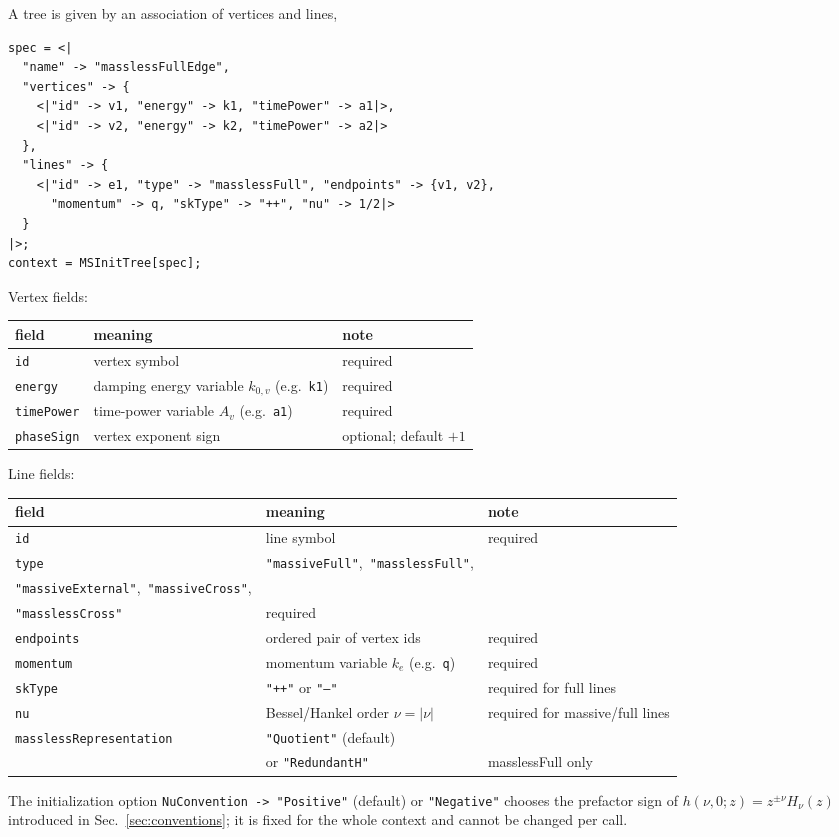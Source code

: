 \documentclass[11pt,a4paper]{article}
\begin{document}
A tree is given by an association of vertices and lines,
\begin{verbatim}
spec = <|
  "name" -> "masslessFullEdge",
  "vertices" -> {
    <|"id" -> v1, "energy" -> k1, "timePower" -> a1|>,
    <|"id" -> v2, "energy" -> k2, "timePower" -> a2|>
  },
  "lines" -> {
    <|"id" -> e1, "type" -> "masslessFull", "endpoints" -> {v1, v2},
      "momentum" -> q, "skType" -> "++", "nu" -> 1/2|>
  }
|>;
context = MSInitTree[spec];
\end{verbatim}
Vertex fields:
\begin{center}
\begin{tabular}{@{}lp{5.5cm}p{3.8cm}@{}}
\toprule
field & meaning & note\\
\midrule
\texttt{id} & vertex symbol & required\\
\texttt{energy} & damping energy variable $k_{0,v}$ (e.g.\ \texttt{k1}) & required\\
\texttt{timePower} & time-power variable $A_v$ (e.g.\ \texttt{a1}) & required\\
\texttt{phaseSign} & vertex exponent sign & optional; default $+1$\\
\bottomrule
\end{tabular}
\end{center}
Line fields:
\begin{center}
\begin{tabular}{@{}p{4.4cm}p{5.3cm}p{3.8cm}@{}}
\toprule
field & meaning & note\\
\midrule
\texttt{id} & line symbol & required\\
\texttt{type} & \texttt{"massiveFull"},\ \texttt{"masslessFull"},\\
                \texttt{"massiveExternal"},\ \texttt{"massiveCross"},\\
                \texttt{"masslessCross"} & required\\
\texttt{endpoints} & ordered pair of vertex ids & required\\
\texttt{momentum} & momentum variable $k_e$ (e.g.\ \texttt{q}) & required\\
\texttt{skType} & \texttt{"++"} or \texttt{"--"} & required for full lines\\
\texttt{nu} & Bessel/Hankel order $\nu=|\nu|$ & required for massive/full lines\\
\texttt{masslessRepresentation} & \texttt{"Quotient"} (default)\\ & or \texttt{"RedundantH"} &
                masslessFull only\\
\bottomrule
\end{tabular}
\end{center}
The initialization option \texttt{NuConvention -> "Positive"} (default) or \texttt{"Negative"}
chooses the prefactor sign of $h(\nu,0;z)=z^{\pm\nu}H_\nu(z)$ introduced in
Sec.~\ref{sec:conventions}; it is fixed for the whole context and cannot be changed per call.
\end{document}
